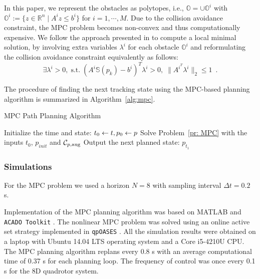 %
\begin{remark}
In this paper, we represent the obstacles as polytopes, i.e., $\mathbb{O} = \cup \mathbb{O}^{i}$ with $\mathbb{O}^{i}:= \{z\in\mathbb{R}^{n} \mid A^{i}z\leq b^{i}\}$ for $i = 1,\cdots ,M$. Due to the collision avoidance constraint, the MPC problem becomes non-convex and thus computationally expensive. We follow the approach presented in \cite{Zhang2017} to compute a local minimal solution, by involving extra variables $\lambda^{i}$ for each obstacle $\mathbb{O}^{i}$ and reformulating the collision avoidance constraint equivalently as follows: 
%
\begin{equation}
\exists \lambda^{i} >0, \; \mbox{s.t.} \; (A^{i} \mathbb{S}(p_k) - b^{i})^{T}\lambda^{i}  > 0, \; \|A^{i^{T}}\lambda^{i}\|_2\leq 1\enspace .
\end{equation}
%
\end{remark}
%
The procedure of finding the next tracking state using the MPC-based planning algorithm is summarized in Algorithm~\ref{alg:mpc}.
%
\begin{algorithm}	
	\caption{MPC Path Planning Algorithm}
	\label{alg:mpc}
	\begin{algorithmic}[1]
 		\STATE Initialize the time and state: $t_0 \leftarrow t, p_0 \leftarrow p$
			\STATE Solve Problem~\ref{pr: MPC} with the inputs $t_0$, $p_{init}$ and $\mathcal C_{p,\text{aug}}$
		\ENDIF
          \STATE Output the next planned state: $p_{t_1}$
	\end{algorithmic}
\end{algorithm}

\subsubsection{Simulations}






For the MPC problem we used a horizon $N=8$ with sampling interval $\Delta t = 0.2$ s.

Implementation of the MPC planning algorithm was based on MATLAB and \texttt{ACADO Toolkit} \cite{Houska2011a}. The nonlinear MPC problem was solved using an online active set strategy implemented in \texttt{qpOASES} \cite{Ferreau2014}. All the simulation results were obtained on a laptop with Ubuntu 14.04 LTS operating system and a Core i5-4210U CPU. The MPC planning algorithm replans every 0.8 s with an average computational time of 0.37 s for each planning loop. The frequency of control was once every 0.1 s for the 8D quadrotor system.

